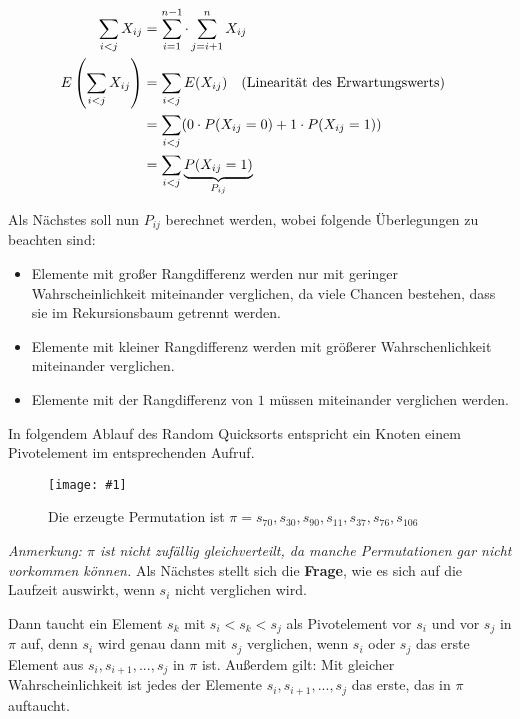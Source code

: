 \documentclass{scrartcl}%
\newcommand{\includepic}[2]{\texttt{[image: \#1]}}
\begin{document}
    \begin{equation*}
        \begin{flalign}
            \sum_{i<j}X_{ij}        &= \sum_{i=1}^{n-1} \cdot \sum_{j=i+1}^{n} X_{ij}&&\\\nonumber
            E\left(\sum_{i<j}X_{ij}\right)  &= \sum_{i<j}E(X_{ij}) \text{\quad (Linearität des Erwartungswerts)}&&\\\nonumber
                                            &= \sum_{i<j}(0 \cdot P(X_{ij} = 0) + 1 \cdot P(X_{ij} = 1))\\\nonumber
                                            &= \sum_{i<j}\underbrace{P(X_{ij}=1)}_{P_{ij}}
        \end{flalign}
    \end{equation*}

    Als Nächstes soll nun $P_{ij}$ berechnet werden, wobei folgende Überlegungen zu beachten sind:
    \begin{itemize}
        \item Elemente mit großer Rangdifferenz werden nur mit geringer Wahrscheinlichkeit miteinander verglichen,
                da viele Chancen bestehen, dass sie im Rekursionsbaum getrennt werden.
        \item Elemente mit kleiner Rangdifferenz werden mit größerer Wahrschenlichkeit miteinander verglichen.
        \item Elemente mit der Rangdifferenz von $1$ müssen miteinander verglichen werden.
    \end{itemize}
    \newpage

    In folgendem Ablauf des Random Quicksorts entspricht ein Knoten einem Pivotelement im entsprechenden Aufruf.
    \begin{figure}[htb]
        \centering
        \includepic{lec_04_c}{0.45}
        \caption{Die erzeugte Permutation ist $\pi = s_{70}, s_{30}, s_{90}, s_{11}, s_{37}, s_{76}, s_{106} $}
    \end{figure}

    \textit{Anmerkung: $\pi$ ist nicht zufällig gleichverteilt, da manche Permutationen gar nicht vorkommen können.}
    \newline
    Als Nächstes stellt sich die \textbf{\textsf{Frage}}, wie es sich auf die Laufzeit auswirkt, wenn $s_i$ nicht verglichen wird.

    Dann taucht ein Element $s_k$ mit $s_i < s_k < s_j$ als Pivotelement vor $s_i$ und vor $s_j$ in $\pi$ auf,
    denn $s_i$ wird genau dann mit $s_j$ verglichen, wenn $s_i$ oder $s_j$ das erste Element aus $s_i, s_{i+1}, ... , s_j$ in $\pi$ ist.
    Außerdem gilt: Mit gleicher Wahrscheinlichkeit ist jedes der Elemente $s_i, s_{i+1}, ... , s_j$ das erste, das in $\pi$ auftaucht.
\end{document}

